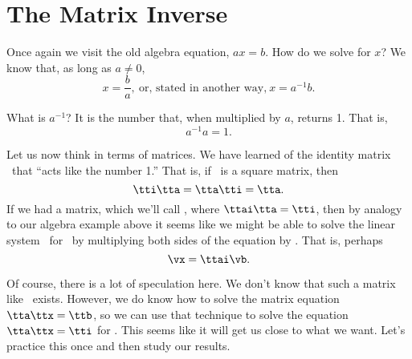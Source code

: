 \section{The Matrix Inverse}\label{sec:inverses}


Once again we visit the old algebra equation, $ax=b$. How do we solve for $x$? We know that, as long as $a\neq 0$, 
\[
x = \frac{b}{a}, \ \text{or, stated in another way,} \ x = a^{-1}b.
\]

What is $a^{-1}$? It is the number that, when multiplied by $a$, returns 1. That is, 
\[
a^{-1}a = 1.
\]

Let us now think in terms of matrices. We have learned of the identity matrix \tti\ that ``acts like the number 1.'' That is, if \tta\ is a square matrix, then 
\[
\tti\tta = \tta\tti = \tta.
\]
If we had a matrix, which we'll call \ttai, where $\ttai\tta=\tti$, then by analogy to our algebra example above it seems like we might be able to solve the linear system \ttaxb\ for \vx\ by multiplying both sides of the equation by \ttai. That is, perhaps 
\[
\vx = \ttai\vb.
\]

Of course, there is a lot of speculation here. We don't know that such a matrix like \ttai\ exists. However, we do know how to solve the matrix equation $\tta\ttx = \ttb$, so we can use that technique to solve the equation $\tta\ttx = \tti$ for \ttx. This seems like it will get us close to what we want. Let's practice this once and then study our results.

\medskip

